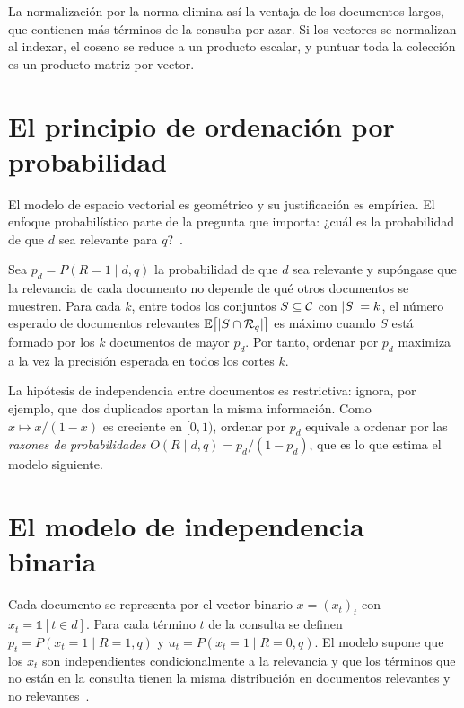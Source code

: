 La normalización por la norma elimina así la ventaja de los documentos largos, que contienen más términos de la consulta por azar. Si los vectores se normalizan al indexar, el coseno se reduce a un producto escalar, y puntuar toda la colección es un producto matriz por vector.

\addtocounter{definicion}{1}%

\section{El principio de ordenación por probabilidad}

El modelo de espacio vectorial es geométrico y su justificación es empírica. El enfoque probabilístico parte de la pregunta que importa: ¿cuál es la probabilidad de que $d$ sea relevante para $q$?~\cite[§11.2]{iir}.

\begin{teorema}\label{teo:prp}
Sea $p_d=P(R=1\mid d,q)$ la probabilidad de que $d$ sea relevante y supóngase que la relevancia de cada documento no depende de qué otros documentos se muestren. Para cada $k$, entre todos los conjuntos $S\subseteq\mathcal{C}$ con $\lvert S\rvert=k$, el número esperado de documentos relevantes $\mathbb{E}\bigl[\lvert S\cap\mathcal{R}_q\rvert\bigr]$ es máximo cuando $S$ está formado por los $k$ documentos de mayor $p_d$. Por tanto, ordenar por $p_d$ maximiza a la vez la precisión esperada en todos los cortes $k$.
\end{teorema}

La hipótesis de independencia entre documentos es restrictiva: ignora, por ejemplo, que dos duplicados aportan la misma información. Como $x\mapsto x/(1-x)$ es creciente en $[0,1)$, ordenar por $p_d$ equivale a ordenar por las \emph{razones de probabilidades} $O(R\mid d,q)=p_d/(1-p_d)$, que es lo que estima el modelo siguiente.

\section{El modelo de independencia binaria}

\begin{definicion}\label{def:bim}
Cada documento se representa por el vector binario $x=(x_t)_t$ con $x_t=\mathbb{1}[t\in d]$. Para cada término $t$ de la consulta se definen $p_t=P(x_t=1\mid R=1,q)$ y $u_t=P(x_t=1\mid R=0,q)$. El modelo supone que los $x_t$ son independientes condicionalmente a la relevancia y que los términos que no están en la consulta tienen la misma distribución en documentos relevantes y no relevantes~\cite[§11.3]{iir}.
\end{definicion}

